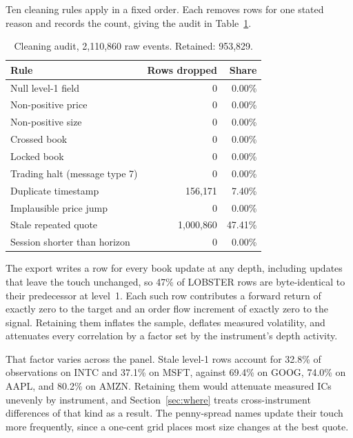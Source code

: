 \documentclass[11pt]{scrartcl}
\begin{document}
Ten cleaning rules apply in a fixed order. Each removes rows for one stated reason and records the count, giving the audit in Table~\ref{tab:cleaning}.

\begin{table}[H]
\centering
\caption{Cleaning audit, 2{,}110{,}860 raw events. Retained: 953{,}829.}
\label{tab:cleaning}
\begin{tabular}{lrr}
\toprule
Rule & Rows dropped & Share \\
\midrule
Null level-1 field            & 0 & 0.00\% \\
Non-positive price            & 0 & 0.00\% \\
Non-positive size             & 0 & 0.00\% \\
Crossed book                  & 0 & 0.00\% \\
Locked book                   & 0 & 0.00\% \\
Trading halt (message type 7) & 0 & 0.00\% \\
Duplicate timestamp           & 156{,}171 & 7.40\% \\
Implausible price jump        & 0 & 0.00\% \\
Stale repeated quote          & 1{,}000{,}860 & 47.41\% \\
Session shorter than horizon  & 0 & 0.00\% \\
\bottomrule
\end{tabular}
\end{table}

The export writes a row for every book update at any depth, including updates that leave the touch unchanged, so 47\% of LOBSTER rows are byte-identical to their predecessor at level~1. Each such row contributes a forward return of exactly zero to the target and an order flow increment of exactly zero to the signal. Retaining them inflates the sample, deflates measured volatility, and attenuates every correlation by a factor set by the instrument's depth activity.

That factor varies across the panel. Stale level-1 rows account for 32.8\% of observations on INTC and 37.1\% on MSFT, against 69.4\% on GOOG, 74.0\% on AAPL, and 80.2\% on AMZN. Retaining them would attenuate measured ICs unevenly by instrument, and Section~\ref{sec:where} treats cross-instrument differences of that kind as a result. The penny-spread names update their touch more frequently, since a one-cent grid places most size changes at the best quote.

\end{document}
